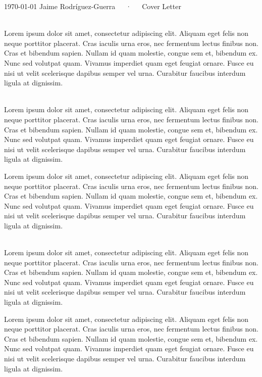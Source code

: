 \documentclass[14pt, a4paper]{awesome-cv}
\begin{document}
\makeletterheader[R]

\makecvfooter
  {\today}
  {Jaime Rodríguez-Guerra~~~·~~~Cover Letter}
  {}

\begin{cvletter}


~\\ Lorem ipsum dolor sit amet, consectetur adipiscing elit. Aliquam eget felis non neque porttitor placerat. Cras iaculis urna eros, nec fermentum lectus finibus non. Cras et bibendum sapien. Nullam id quam molestie, congue sem et, bibendum ex. Nunc sed volutpat quam. Vivamus imperdiet quam eget feugiat ornare. Fusce eu nisi ut velit scelerisque dapibus semper vel urna. Curabitur faucibus interdum ligula at dignissim.

~\\ Lorem ipsum dolor sit amet, consectetur adipiscing elit. Aliquam eget felis non neque porttitor placerat. Cras iaculis urna eros, nec fermentum lectus finibus non. Cras et bibendum sapien. Nullam id quam molestie, congue sem et, bibendum ex. Nunc sed volutpat quam. Vivamus imperdiet quam eget feugiat ornare. Fusce eu nisi ut velit scelerisque dapibus semper vel urna. Curabitur faucibus interdum ligula at dignissim.

Lorem ipsum dolor sit amet, consectetur adipiscing elit. Aliquam eget felis non neque porttitor placerat. Cras iaculis urna eros, nec fermentum lectus finibus non. Cras et bibendum sapien. Nullam id quam molestie, congue sem et, bibendum ex. Nunc sed volutpat quam. Vivamus imperdiet quam eget feugiat ornare. Fusce eu nisi ut velit scelerisque dapibus semper vel urna. Curabitur faucibus interdum ligula at dignissim.


~\\ Lorem ipsum dolor sit amet, consectetur adipiscing elit. Aliquam eget felis non neque porttitor placerat. Cras iaculis urna eros, nec fermentum lectus finibus non. Cras et bibendum sapien. Nullam id quam molestie, congue sem et, bibendum ex. Nunc sed volutpat quam. Vivamus imperdiet quam eget feugiat ornare. Fusce eu nisi ut velit scelerisque dapibus semper vel urna. Curabitur faucibus interdum ligula at dignissim.

Lorem ipsum dolor sit amet, consectetur adipiscing elit. Aliquam eget felis non neque porttitor placerat. Cras iaculis urna eros, nec fermentum lectus finibus non. Cras et bibendum sapien. Nullam id quam molestie, congue sem et, bibendum ex. Nunc sed volutpat quam. Vivamus imperdiet quam eget feugiat ornare. Fusce eu nisi ut velit scelerisque dapibus semper vel urna. Curabitur faucibus interdum ligula at dignissim.

\end{cvletter}

\makeletterclosing
\end{document}
